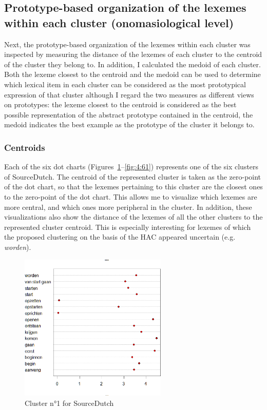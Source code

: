 \subsection{Prototype-based organization of the lexemes within each cluster (onomasiological level)}
\label{sec:4.2.3}  
Next, the prototype-based organization of the lexemes within each cluster was inspected by measuring the distance of the lexemes of each cluster to the centroid of the cluster they belong to. In addition, I calculated the medoid of each cluster. Both the lexeme closest to the centroid and the medoid can be used to determine which lexical item in each cluster can be considered as the most prototypical expression of that cluster although I regard the two measures as different views on prototypes: the lexeme closest to the centroid is considered as the best possible representation of the abstract prototype contained in the centroid, the medoid indicates the best example as the prototype of the cluster it belongs to.

\subsubsection{Centroids}
\label{sec:4.2.3.1}  
Each of the six dot charts (Figures~\ref{fig:4:56}--\ref{fig:4:61}) represents one of the six clusters of SourceDutch. The centroid of the represented cluster is taken as the zero-point of the dot chart, so that the lexemes pertaining to this cluster are the closest ones to the zero-point of the dot chart. This allows me to visualize which lexemes are more central, and which ones more peripheral in the cluster. In addition, these visualizations also show the distance of the lexemes of all the other clusters to the represented cluster centroid. This is especially interesting for lexemes of which the proposed clustering on the basis of the HAC appeared uncertain (e.g. \textit{worden}).

\begin{figure}
\includegraphics[width=7cm]{figures/Vandevoorde2-img56.png}
\caption{\label{fig:4:56}Cluster n°1 for SourceDutch}
\end{figure}

